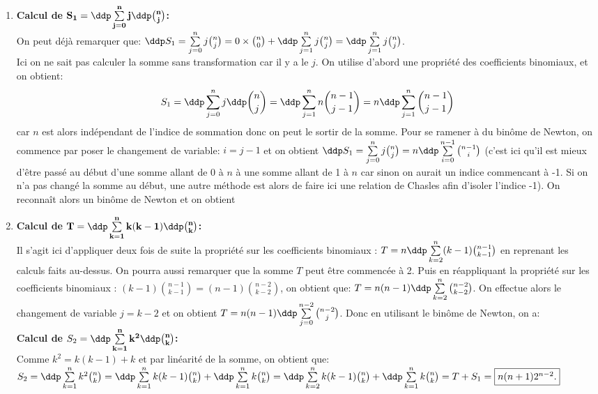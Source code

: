 
\begin{correction}   \;
\begin{enumerate}
\item \textbf{Calcul de $\mathbf{S_1=\ddp \sum\limits_{j=0}^n j\ddp \binom{n}{j}}$:}\\
\noindent On peut d\'ej\`{a} remarquer que: $\ddp S_1= \sum\limits_{j=0}^n j\binom{n}{j}=0\times \binom{n}{0}+\ddp \sum\limits_{j=1}^n j\binom{n}{j}=\ddp \sum\limits_{j=1}^n j\binom{n}{j}$. \\
Ici on ne sait pas calculer la somme sans transformation car il y a le $j$. On utilise d'abord une propri\'et\'e des coefficients binomiaux, et on obtient: 
$$S_1=\ddp \sum\limits_{j=0}^n j\ddp \binom{n}{j}=\ddp \sum\limits_{j=1}^n n\binom{n-1}{j-1}=n\ddp \sum\limits_{j=1}^n \binom{n-1}{j-1}$$ 
car $n$ est alors ind\'ependant de l'indice de sommation donc on peut le sortir de la somme. Pour se ramener \`{a} du bin\^{o}me de Newton, on commence par poser le changement de variable: $i=j-1$ et on obtient $\ddp S_1=\sum\limits_{j=0}^n j\binom{n}{j}=n \ddp \sum\limits_{i=0}^{n-1} \binom{n-1}{i}$ (c'est ici qu'il est mieux d'\^{e}tre pass\'e au d\'ebut d'une somme allant de 0 \`{a} $n$ \`{a} une somme allant de 1 \`{a} $n$ car sinon on aurait un indice commencant \`{a} -1. Si on n'a pas chang\'e la somme au d\'ebut, une autre m\'ethode est alors de faire ici une relation de Chasles afin d'isoler l'indice -1). On reconna\^{i}t alors un bin\^{o}me de Newton et on obtient 
\item   \textbf{Calcul de $\mathbf{T=\ddp \sum\limits_{k=1}^n k(k-1)\ddp \binom{n}{k}}$:}\\
\noindent Il s'agit ici d'appliquer deux fois de suite la propri\'et\'e sur les coefficients binomiaux : $T=n\ddp \sum\limits_{k=2}^{n} (k-1)\binom{n-1}{k-1}$ en reprenant les calculs faits au-dessus. On pourra aussi remarquer que la somme $T$ peut \^{e}tre commenc\'ee \`{a} 2. Puis en r\'eappliquant la propri\'et\'e sur les coefficients binomiaux : $(k-1)\binom{n-1}{k-1}=(n-1)\binom{n-2}{k-2}$, on obtient que: $T=n(n-1)\ddp \sum\limits_{k=2}^{n} \binom{n-2}{k-2}$. On effectue alors le changement de variable $j=k-2$ et on obtient $T=n(n-1)\ddp \sum\limits_{j=0}^{n-2} \binom{n-2}{j}$. Donc en utilisant le bin\^{o}me de Newton, on a: \\
\noindent \textbf{Calcul de $S_2=\mathbf{\ddp \sum\limits_{k=1}^n k^2\ddp \binom{n}{k}}$:}\\
\noindent Comme $k^2=k(k-1)+k$ et par lin\'earit\'e de la somme, on obtient que: $S_2=\ddp \sum\limits_{k=1}^{n} k^2\binom{n}{k}=\ddp \sum\limits_{k=1}^{n} k(k-1)\binom{n}{k}+\ddp \sum\limits_{k=1}^{n} k\binom{n}{k}=\ddp \sum\limits_{k=2}^{n} k(k-1)\binom{n}{k}+\ddp \sum\limits_{k=1}^{n} k\binom{n}{k}=T+S_1=\fbox{$n(n+1)2^{n-2}$.}$

\end{enumerate}
\end{correction}
